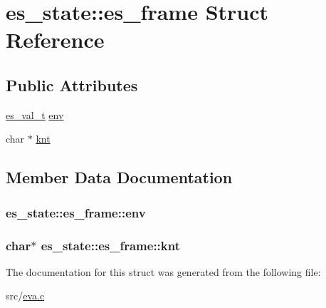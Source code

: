 \hypertarget{structes__state_1_1es__frame}{\section{es\-\_\-state\-:\-:es\-\_\-frame Struct Reference}
\label{structes__state_1_1es__frame}
}
\subsection*{Public Attributes}
\begin{DoxyCompactItemize}
\item 
\hyperlink{eva_8h_a31286b308f3660f383b567314be88045}{es\-\_\-val\-\_\-t} \hyperlink{structes__state_1_1es__frame_a70131569cf9ae3638b26938be1cff3e9}{env}
\item 
char $\ast$ \hyperlink{structes__state_1_1es__frame_a085c4196833d332106d34652b60ebc5b}{knt}
\end{DoxyCompactItemize}


\subsection{Member Data Documentation}
\hypertarget{structes__state_1_1es__frame_a70131569cf9ae3638b26938be1cff3e9}{
\subsubsection[{env}]{ es\-\_\-state\-::es\-\_\-frame\-::env}}\label{structes__state_1_1es__frame_a70131569cf9ae3638b26938be1cff3e9}
\hypertarget{structes__state_1_1es__frame_a085c4196833d332106d34652b60ebc5b}{
\subsubsection[{knt}]{\setlength{\rightskip}{0pt plus 5cm}char$\ast$ es\-\_\-state\-::es\-\_\-frame\-::knt}}\label{structes__state_1_1es__frame_a085c4196833d332106d34652b60ebc5b}


The documentation for this struct was generated from the following file\-:\begin{DoxyCompactItemize}
\item 
src/\hyperlink{eva_8c}{eva.\-c}\end{DoxyCompactItemize}
